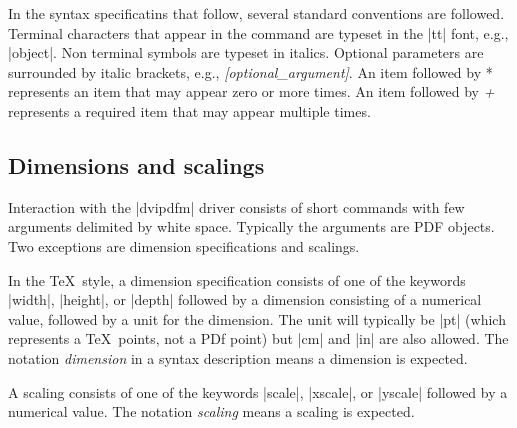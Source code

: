 In the syntax specificatins that follow, several
standard conventions are followed.  Terminal
characters that appear in the command 
are typeset in the |tt| font, e.g., |object|.
Non terminal symbols are typeset in italics.
Optional parameters are surrounded by italic brackets, e.g.,
{\it [optional\_argument]}.  An item followed
by {*} represents an item that may appear
zero or more times.  An item followed by {\it +}
represents a required item that may appear multiple times.

\subsection{Dimensions and scalings}
Interaction with the |dvipdfm| driver consists
of short commands with few arguments delimited by white space.
Typically the arguments are PDF objects.
Two exceptions are dimension specifications and scalings.

In the \TeX\ style, a dimension specification consists of one of the keywords
|width|, |height|, or |depth| followed by a dimension
consisting of a numerical value, followed by a unit for the dimension.  The
unit will typically be |pt| (which represents a \TeX\ points, not a
PDf point) but |cm| and |in| are also allowed.  The notation
{\it dimension} in a syntax description means a dimension is expected.

A scaling consists of one of the keywords |scale|, |xscale|, or
|yscale| followed by a numerical value.  The notation
{\it scaling} means a scaling is expected. 


